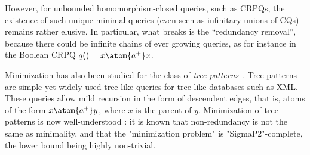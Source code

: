 However, for unbounded homomorphism-closed queries, such as CRPQs, the existence of such unique minimal queries (even seen as infinitary unions of CQs) remains rather elusive. In particular, what breaks is the ``redundancy removal'', because there could be infinite chains of ever growing queries, as for instance in the Boolean CRPQ $q() = x \atom{a^+} x$.

Minimization has also been studied for the class of \emph{tree patterns}~\cite{FFM08,KS08,min-tree-patterns}. Tree patterns are simple yet widely used tree-like queries for tree-like databases such as XML. These queries allow mild recursion in the form of descendent edges, that is, atoms of the form $x \atom{a^+} y$, where $x$ is the parent of $y$. 
Minimization of tree patterns is now well-understood \cite{min-tree-patterns}:  it is known that non-redundancy is not the same as minimality, and that the "minimization problem" is "SigmaP2"-complete, the lower bound being highly non-trivial.